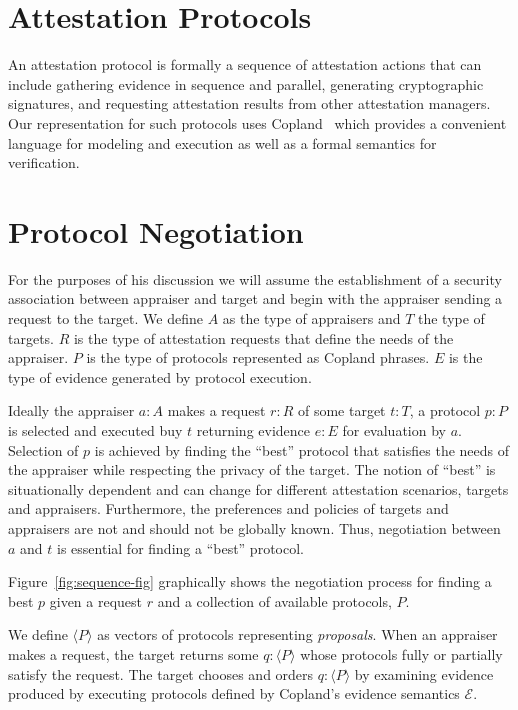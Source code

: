 \documentclass[sigconf,authordraft]{acmart}
\begin{document}
\section{Attestation Protocols}

An attestation protocol is formally a sequence of attestation actions
that can include gathering evidence in sequence and parallel,
generating cryptographic signatures, and requesting attestation
results from other attestation managers.  Our representation for such
protocols uses Copland~\citep{Ramsdell:2019aa} which provides a
convenient language for modeling and execution as well as a formal
semantics for verification.


\section{Protocol Negotiation}

For the purposes of his discussion we will assume the establishment of
a security association between appraiser and target and begin with the
appraiser sending a request to the target.  We define $A$ as the type
of appraisers and $T$ the type of targets.  $R$ is the type of
attestation requests that define the needs of the appraiser.  $P$ is
the type of protocols represented as Copland phrases.  $E$ is the type
of evidence generated by protocol execution.

Ideally the appraiser $a:A$ makes a request $r:R$ of some target
$t:T$, a protocol $p:P$ is selected and executed buy $t$ returning
evidence $e:E$ for evaluation by $a$.  Selection of $p$ is achieved by
finding the ``best'' protocol that satisfies the needs of the
appraiser while respecting the privacy of the target. The notion of
``best'' is situationally dependent and can change for different
attestation scenarios, targets and appraisers.  Furthermore, the
preferences and policies of targets and appraisers are not and should
not be globally known.  Thus, negotiation between $a$ and $t$ is
essential for finding a ``best'' protocol.

Figure~\ref{fig:sequence-fig} graphically shows the negotiation
process for finding a best $p$ given a request $r$ and a collection of
available protocols, $P$.

We define $\langle P \rangle$ as vectors of protocols representing
\emph{proposals}.  When an appraiser makes a request, the target
returns some $q:\langle P \rangle$ whose protocols fully or partially
satisfy the request. The target chooses and orders
$q:\langle P\rangle$ by examining evidence produced by executing
protocols defined by Copland's evidence semantics $\mathcal{E}$.
\end{document}
